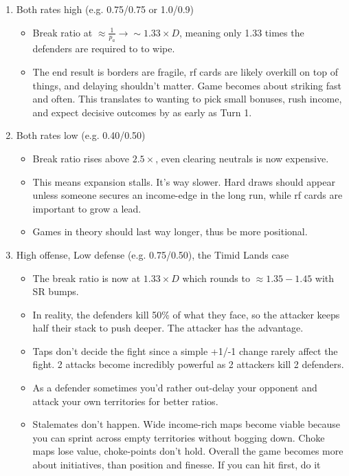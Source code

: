\begin{enumerate}
    \item Both rates high (e.g. 0.75/0.75 or 1.0/0.9)
    \begin{itemize}
        \item Break ratio at $\approx \frac{1}{p_a} \rightarrow \sim 1.33 \times D$, meaning only 1.33 times the defenders are required to to wipe. 
        \item The end result is borders are fragile, rf cards are likely overkill on top of things, and delaying shouldn't matter. Game becomes about striking fast and often. This translates to wanting to pick small bonuses, rush income, and expect decisive outcomes by as early as Turn 1.
    \end{itemize}
    \item Both rates low (e.g. 0.40/0.50)
    \begin{itemize}
        \item Break ratio rises above $2.5 \times$, even clearing neutrals is now expensive.
        \item This means expansion stalls. It's way slower. Hard draws should appear unless someone secures an income-edge in the long run, while rf cards are important to grow a lead.
        \item Games in theory should last way longer, thus be more positional.
    \end{itemize}
    \item High offense, Low defense (e.g. 0.75/0.50), the Timid Lands case \label{Reverse_Kill_Rates}
    \begin{itemize}
        \item The break ratio is now at $1.33\times D$ which rounds to $\approx 1.35 - 1.45$ with SR bumps.
        \item In reality, the defenders kill 50\% of what they face, so the attacker keeps half their stack to push deeper. The attacker has the advantage. 
        \item Taps don't decide the fight since a simple +1/-1 change rarely affect the fight. 2 attacks become incredibly powerful as 2 attackers kill 2 defenders. 
        \item As a defender sometimes you'd rather out-delay your opponent and attack your own territories for better ratios.
        \item Stalemates don't happen. Wide income-rich maps become viable because you can sprint across empty territories without bogging down. Choke maps lose value, choke-points don't hold. Overall the game becomes more about initiatives, than position and finesse. If you can hit first, do it

\end{itemize}
\end{enumerate}

